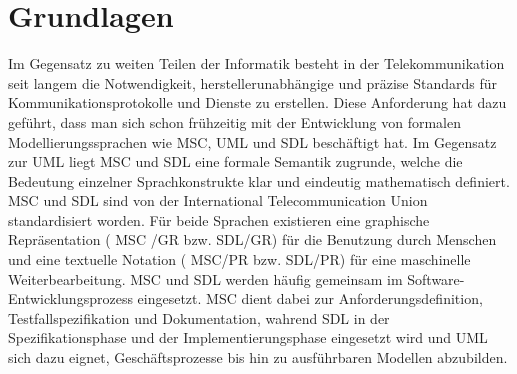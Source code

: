 \chapter{Grundlagen}
\label{ch:Grundlagen}
Im Gegensatz zu weiten Teilen der Informatik besteht in der Telekommunikation seit langem die Notwendigkeit, herstellerunabhängige und präzise Standards für Kommunikationsprotokolle und Dienste zu erstellen. Diese Anforderung hat dazu geführt, dass man sich schon frühzeitig mit der Entwicklung von formalen Modellierungssprachen wie \ac{MSC}, \ac{UML} und \ac{SDL} beschäftigt hat. Im Gegensatz zur \ac{UML} liegt \ac{MSC} und \ac{SDL} eine formale Semantik zugrunde, welche die Bedeutung einzelner Sprachkonstrukte klar und eindeutig mathematisch definiert.
\ac{MSC} und \ac{SDL} sind von der International Telecommunication Union standardisiert worden. Für beide Sprachen existieren eine graphische Repräsentation ( \ac{MSC} /GR bzw.  \ac{SDL}/GR) für die Benutzung durch Menschen und eine textuelle Notation ( \ac{MSC}/PR bzw. \ac{SDL}/PR) für eine maschinelle Weiterbearbeitung. \ac{MSC}  und \ac{SDL}  werden häufig gemeinsam im Software-Entwicklungsprozess eingesetzt. \ac{MSC} dient dabei zur Anforderungsdefinition, Testfallspezifikation und Dokumentation, wahrend  \ac{SDL} in der Spezifikationsphase und der Implementierungsphase eingesetzt wird und \ac{UML} sich dazu eignet, Geschäftsprozesse bis hin zu ausführbaren Modellen abzubilden.




